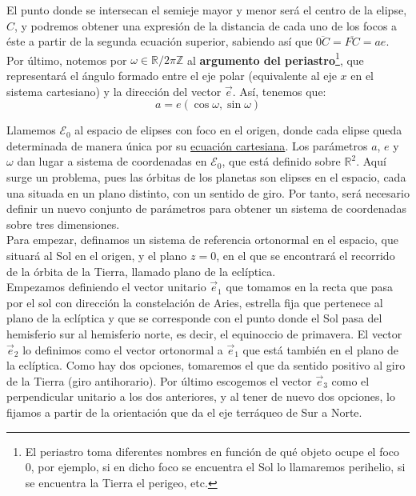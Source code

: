 \documentclass[11pt]{book}
\begin{document}
El punto donde se intersecan el semieje mayor y menor será el centro de la elipse, $C$, y podremos obtener una expresión de la distancia de cada uno de los focos a éste a partir de la segunda ecuación superior, sabiendo así que $\overline{0C}=\overline{FC}=ae$.\\

Por último, notemos por $\omega\in\mathbb{R}/2\pi\mathbb{Z}$ al \textbf{argumento del periastro}\footnote{El periastro toma diferentes nombres en función de qué objeto ocupe el foco 0, por ejemplo, si en dicho foco se encuentra el Sol lo llamaremos perihelio, si se encuentra la Tierra el perigeo, etc.}, que representará el ángulo formado entre el eje polar (equivalente al eje $x$ en el sistema cartesiano) y la dirección del vector $\vec{e}$. Así, tenemos que:
\[
a=e(\cos{\omega},\sin{\omega})
\]

Llamemos $\mathcal{E}_0$ al espacio de elipses con foco en el origen, donde cada elipse queda determinada de manera única por su \hyperref[eq:elipse_cartesiana]{ecuación cartesiana}. Los parámetros $a$, $e$ y $\omega$ dan lugar a sistema de coordenadas en $\mathcal{E}_0$, que está definido sobre $\mathbb{R}^2$. Aquí surge un problema, pues las órbitas de los planetas son elipses en el espacio, cada una situada en un plano distinto, con un sentido de giro. Por tanto, será necesario definir un nuevo conjunto de parámetros para obtener un sistema de coordenadas sobre tres dimensiones.\\

Para empezar, definamos un sistema de referencia ortonormal en el espacio, que situará al Sol en el origen, y el plano $z=0$, en el que se encontrará el recorrido de la órbita de la Tierra, llamado plano de la eclíptica.\\

Empezamos definiendo el vector unitario $\vec{e}_1$ que tomamos en la recta que pasa por el sol con dirección la constelación de Aries, estrella fija que pertenece al plano de la eclíptica y que se corresponde con el punto donde el Sol pasa del hemisferio sur al hemisferio norte, es decir, el equinoccio de primavera. El vector $\vec{e}_2$ lo definimos como el vector ortonormal a $\vec{e}_1$ que está también en el plano de la eclíptica. Como hay dos opciones, tomaremos el que da sentido positivo al giro de la Tierra (giro antihorario). Por último escogemos el vector $\vec{e}_3$ como el perpendicular unitario a los dos anteriores, y al tener de nuevo dos opciones, lo fijamos a partir de la orientación que da el eje terráqueo de Sur a Norte.\\
\end{document}
